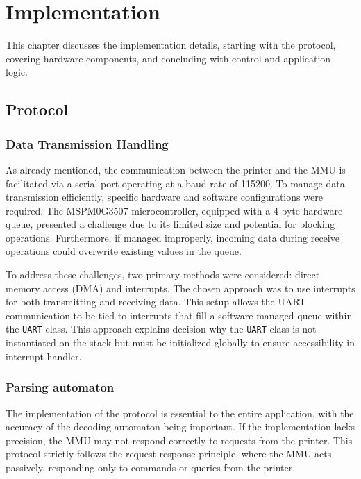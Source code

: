 \chapter{Implementation}

This chapter discusses the implementation details, starting with the protocol, covering hardware components, and concluding with control and application logic.

\section{Protocol}

\subsection{Data Transmission Handling}

As already mentioned, the communication between the printer and the MMU is facilitated via a serial port operating at a baud rate of 115200. To manage data transmission efficiently, specific hardware and software configurations were required. The MSPM0G3507 microcontroller, equipped with a 4-byte hardware queue, presented a challenge due to its limited size and potential for blocking operations. Furthermore, if managed improperly, incoming data during receive operations could overwrite existing values in the queue.

To address these challenges, two primary methods were considered: direct memory access (DMA) and interrupts. The chosen approach was to use interrupts for both transmitting and receiving data. This setup allows the UART communication to be tied to interrupts that fill a software-managed queue within the \texttt{UART} class. This approach explains decision why the \texttt{UART} class is not instantiated on the stack but must be initialized globally to ensure accessibility in interrupt handler.

\subsection{Parsing automaton}

The implementation of the protocol is essential to the entire application, with the accuracy of the decoding automaton being important. If the implementation lacks precision, the MMU may not respond correctly to requests from the printer. This protocol strictly follows the request-response principle, where the MMU acts passively, responding only to commands or queries from the printer.

